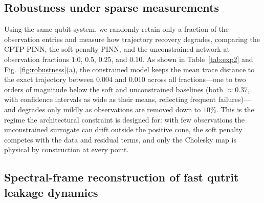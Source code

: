 \documentclass[twocolumn,aps,prxquantum,superscriptaddress,nofootinbib,floatfix,longbibliography]{revtex4-2}
\begin{document}
\subsection{Robustness under sparse measurements}
\label{sec:experiment_sparse}

Using the same qubit system, we randomly retain only a fraction of the observation entries and measure how trajectory recovery degrades, comparing the CPTP-PINN, the soft-penalty PINN, and the unconstrained network at observation fractions $1.0$, $0.5$, $0.25$, and $0.10$. As shown in Table~\ref{tab:exp2} and Fig.~\ref{fig:robustness}(a), the constrained model keeps the mean trace distance to the exact trajectory between $0.004$ and $0.010$ across all fractions---one to two orders of magnitude below the soft and unconstrained baselines (both $\approx0.37$, with confidence intervals as wide as their means, reflecting frequent failures)---and degrades only mildly as observations are removed down to $10\%$. This is the regime the architectural constraint is designed for: with few observations the unconstrained surrogate can drift outside the positive cone, the soft penalty competes with the data and residual terms, and only the Cholesky map is physical by construction at every point.

\begin{table}[t]
\centering
\caption{\textbf{Robustness under sparse measurements (Experiment~2).} Mean trace distance to the exact single-qubit trajectory versus retained observation fraction, for the three neural methods. Mean $\pm$ $95\%$ CI over 5 seeds.}
\label{tab:exp2}
\end{table}

\subsection{Spectral-frame reconstruction of fast qutrit leakage dynamics}
\label{sec:experiment_qutrit}
\end{document}
